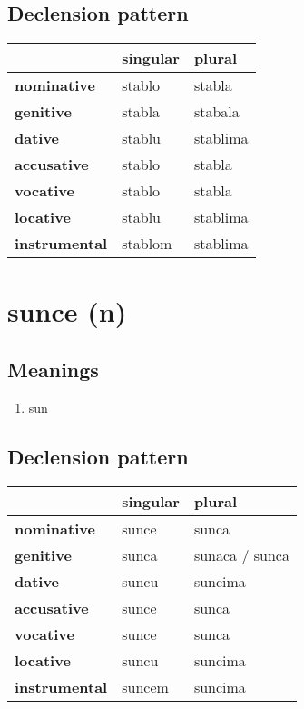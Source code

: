 \subsection*{Declension pattern}
\begin{tabularx}{\linewidth}{Xll}
\toprule
{} & singular &    plural \\
\midrule
\textbf{nominative  } &   stablo &    stabla \\
\textbf{genitive    } &   stabla &   stabala \\
\textbf{dative      } &   stablu &  stablima \\
\textbf{accusative  } &   stablo &    stabla \\
\textbf{vocative    } &   stablo &    stabla \\
\textbf{locative    } &   stablu &  stablima \\
\textbf{instrumental} &  stablom &  stablima \\
\bottomrule
\end{tabularx}

\filbreak
\section{sunce (n)}
\subsection*{Meanings}
\begin{enumerate}
\item sun
\end{enumerate}
\subsection*{Declension pattern}
\begin{tabularx}{\linewidth}{Xll}
\toprule
{} & singular &          plural \\
\midrule
\textbf{nominative  } &    sunce &           sunca \\
\textbf{genitive    } &    sunca &  sunaca / sunca \\
\textbf{dative      } &    suncu &         suncima \\
\textbf{accusative  } &    sunce &           sunca \\
\textbf{vocative    } &    sunce &           sunca \\
\textbf{locative    } &    suncu &         suncima \\
\textbf{instrumental} &   suncem &         suncima \\
\bottomrule
\end{tabularx}

